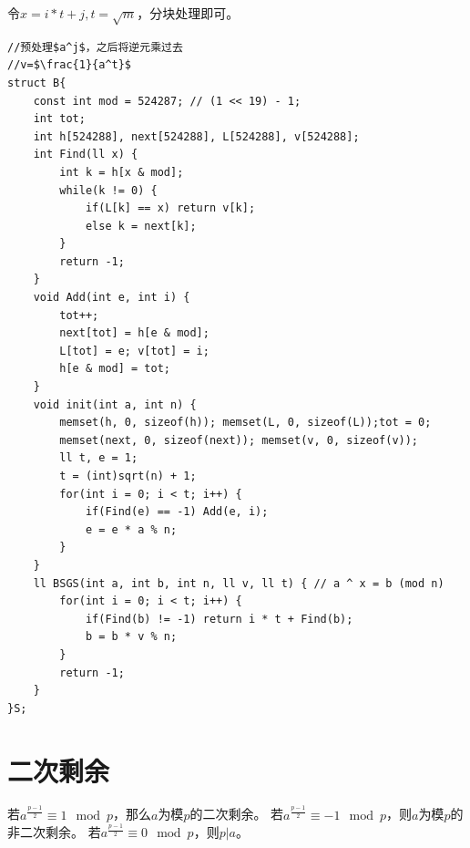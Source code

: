 \documentclass[a4paper,11pt,twoside,fontset = fandol,UTF8]{ctexbook} %
\begin{document}
	令$x=i*t+j,t=\sqrt{m}$，分块处理即可。
	\begin{lstlisting}
//预处理$a^j$，之后将逆元乘过去
//v=$\frac{1}{a^t}$
struct B{
    const int mod = 524287; // (1 << 19) - 1;
    int tot;
    int h[524288], next[524288], L[524288], v[524288];
    int Find(ll x) {
        int k = h[x & mod];
        while(k != 0) {
            if(L[k] == x) return v[k];
            else k = next[k];
        }
        return -1;
    }
    void Add(int e, int i) {
        tot++;
        next[tot] = h[e & mod];
        L[tot] = e; v[tot] = i;
        h[e & mod] = tot;
    }
    void init(int a, int n) {
        memset(h, 0, sizeof(h)); memset(L, 0, sizeof(L));tot = 0;
        memset(next, 0, sizeof(next)); memset(v, 0, sizeof(v));
        ll t, e = 1;
        t = (int)sqrt(n) + 1;
        for(int i = 0; i < t; i++) {
            if(Find(e) == -1) Add(e, i);
            e = e * a % n;
        }
    }
    ll BSGS(int a, int b, int n, ll v, ll t) { // a ^ x = b (mod n)
        for(int i = 0; i < t; i++) {
            if(Find(b) != -1) return i * t + Find(b);
            b = b * v % n;
        }
        return -1;
    }
}S;
	\end{lstlisting}
	\section{二次剩余}
	若$a^{\frac{p-1}{2}}\equiv 1\mod p$，那么$a$为模$p$的二次剩余。
	若$a^{\frac{p-1}{2}}\equiv -1\mod p$，则$a$为模$p$的非二次剩余。
	若$a^{\frac{p-1}{2}}\equiv 0\mod p$，则$p|a$。
	
\end{document}
